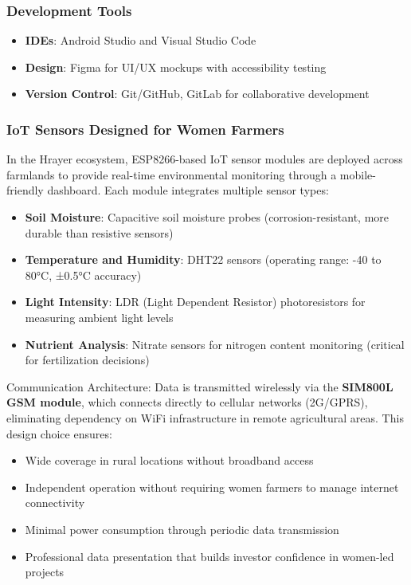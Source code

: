 \documentclass[9pt,twocolumn,twoside]{article}
\begin{document}
\subsubsection{Development Tools}
\begin{itemize}
\item \textbf{IDEs}: Android Studio and Visual Studio Code
\item \textbf{Design}: Figma for UI/UX mockups with accessibility testing
\item \textbf{Version Control}: Git/GitHub, GitLab for collaborative development
\end{itemize}

\subsubsection{IoT Sensors Designed for Women Farmers}

In the Hrayer ecosystem, ESP8266-based IoT sensor modules are deployed across farmlands to provide real-time environmental monitoring through a mobile-friendly dashboard. Each module integrates multiple sensor types:
\begin{itemize}
\item \textbf{Soil Moisture}: Capacitive soil moisture probes (corrosion-resistant, more durable than resistive sensors)
\item \textbf{Temperature and Humidity}: DHT22 sensors (operating range: -40 to 80°C, ±0.5°C accuracy)
\item \textbf{Light Intensity}: LDR (Light Dependent Resistor) photoresistors for measuring ambient light levels
\item \textbf{Nutrient Analysis}: Nitrate sensors for nitrogen content monitoring (critical for fertilization decisions)
\end{itemize}

Communication Architecture:
Data is transmitted wirelessly via the \textbf{SIM800L GSM module}, which connects directly to cellular networks (2G/GPRS), eliminating dependency on WiFi infrastructure in remote agricultural areas. This design choice ensures:
\begin{itemize}
\item Wide coverage in rural locations without broadband access
\item Independent operation without requiring women farmers to manage internet connectivity
\item Minimal power consumption through periodic data transmission
\item Professional data presentation that builds investor confidence in women-led projects
\end{itemize}
\end{document}
